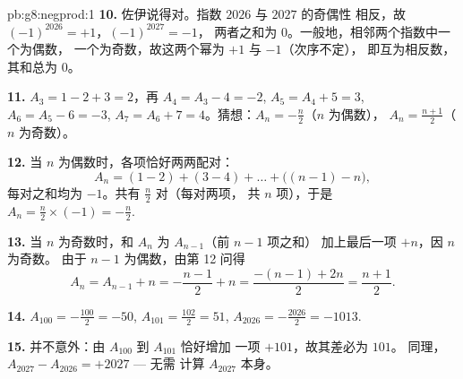 \begin{solution}{pb:g8:negprod:1}
\textbf{10.} 佐伊说得对。指数 $2026$ 与 $2027$ 的奇偶性
相反，故 $(-1)^{2026} = +1$，$(-1)^{2027} = -1$，
两者之和为 $0$。一般地，相邻两个指数中一个为偶数，
一个为奇数，故这两个幂为 $+1$ 与 $-1$（次序不定），
即互为相反数，其和总为 $0$。

\textbf{11.} $A_3 = 1 - 2 + 3 = 2$，再
$A_4 = A_3 - 4 = -2$, $A_5 = A_4 + 5 = 3$, $A_6 = A_5 - 6 = -3$,
$A_7 = A_6 + 7 = 4$。猜想：$A_n = -\frac{n}{2}$（$n$ 为偶数），
$A_n = \frac{n+1}{2}$（$n$ 为奇数）。

\textbf{12.} 当 $n$ 为偶数时，各项恰好两两配对：
\[
A_n = (1 - 2) + (3 - 4) + \dots + \bigl((n-1) - n\bigr),
\]
每对之和均为 $-1$。共有 $\frac{n}{2}$ 对（每对两项，
共 $n$ 项），于是
$A_n = \frac{n}{2} \times (-1) = -\frac{n}{2}$.

\textbf{13.} 当 $n$ 为奇数时，和 $A_n$ 为 $A_{n-1}$（前 $n - 1$ 项之和）
加上最后一项 $+n$，因 $n$ 为奇数。
由于 $n - 1$ 为偶数，由第 12 问得
\[
A_n = A_{n-1} + n = -\frac{n-1}{2} + n
= \frac{-(n-1) + 2n}{2} = \frac{n+1}{2} .
\]

\textbf{14.} $A_{100} = -\frac{100}{2} = -50$, \quad
$A_{101} = \frac{102}{2} = 51$, \quad
$A_{2026} = -\frac{2026}{2} = -1013$.

\textbf{15.} 并不意外：由 $A_{100}$ 到 $A_{101}$ 恰好增加
一项 $+101$，故其差必为 $101$。
同理，$A_{2027} - A_{2026} = +2027$ --- 无需
计算 $A_{2027}$ 本身。
\end{solution}
